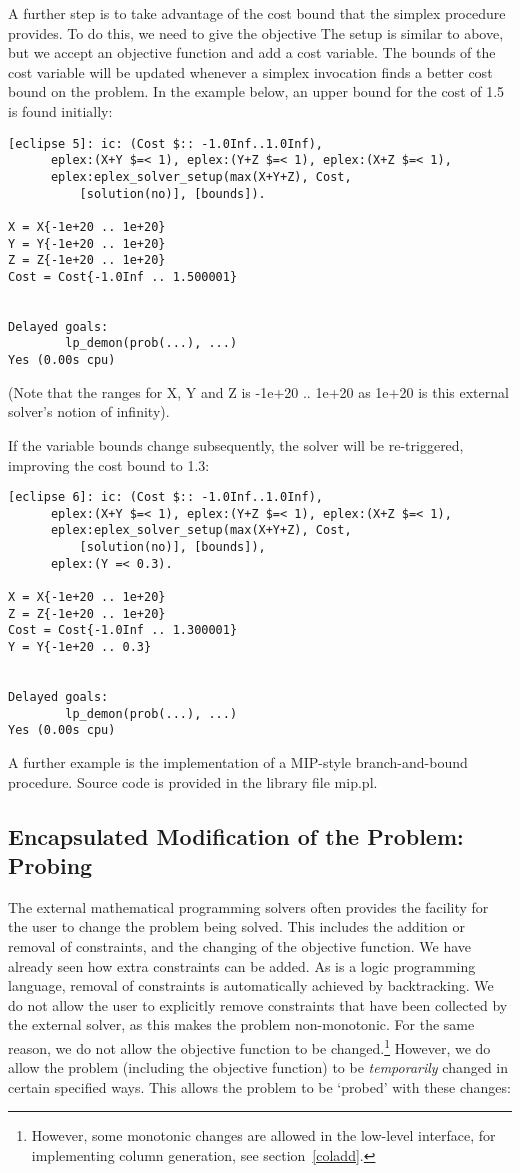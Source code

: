 A further step is to take advantage of the cost bound that the simplex
procedure provides. To do this, we need to give the objective 
The setup is similar to above, but we accept an objective function and
add a cost variable. The bounds of the cost variable will be updated
whenever a simplex invocation finds a better cost bound on the problem.
In the example below, an upper bound for the cost of 1.5 is found
initially:
\begin{verbatim}
[eclipse 5]: ic: (Cost $:: -1.0Inf..1.0Inf), 
      eplex:(X+Y $=< 1), eplex:(Y+Z $=< 1), eplex:(X+Z $=< 1),
      eplex:eplex_solver_setup(max(X+Y+Z), Cost, 
          [solution(no)], [bounds]).

X = X{-1e+20 .. 1e+20}
Y = Y{-1e+20 .. 1e+20}
Z = Z{-1e+20 .. 1e+20}
Cost = Cost{-1.0Inf .. 1.500001}


Delayed goals:
        lp_demon(prob(...), ...)
Yes (0.00s cpu)
\end{verbatim}
(Note that the ranges for X, Y and Z is -1e+20 .. 1e+20 as 1e+20 is this
external solver's notion of infinity). 

If the variable bounds change subsequently, the solver will be re-triggered,
improving the cost bound to 1.3:
\begin{verbatim}
[eclipse 6]: ic: (Cost $:: -1.0Inf..1.0Inf), 
      eplex:(X+Y $=< 1), eplex:(Y+Z $=< 1), eplex:(X+Z $=< 1),
      eplex:eplex_solver_setup(max(X+Y+Z), Cost, 
          [solution(no)], [bounds]), 
      eplex:(Y =< 0.3).

X = X{-1e+20 .. 1e+20}
Z = Z{-1e+20 .. 1e+20}
Cost = Cost{-1.0Inf .. 1.300001}
Y = Y{-1e+20 .. 0.3}


Delayed goals:
        lp_demon(prob(...), ...)
Yes (0.00s cpu)
\end{verbatim}

A further example is the implementation of a MIP-style branch-and-bound
procedure. Source code is provided in the library file mip.pl.

\subsection{Encapsulated Modification of the Problem: Probing}

The external mathematical programming solvers often provides the facility
for the user to change the problem being solved. This includes the addition
or removal of constraints, and the changing of the objective function.
We have already seen how extra constraints can be added. As {\eclipse} is a
logic programming language, removal of constraints is automatically
achieved by backtracking. We do not allow the user to explicitly remove
constraints that have been collected by the external solver, as this makes 
the problem non-monotonic.
For the same reason, we do not allow the objective function to be
changed.\footnote{However, some monotonic changes are allowed in the
low-level interface, for implementing column generation, see
section~\ref{coladd}.}
However, we do allow the problem (including the objective function) to be
{\it temporarily\/} changed in certain specified ways. This allows the
problem to be `probed' with these changes:

